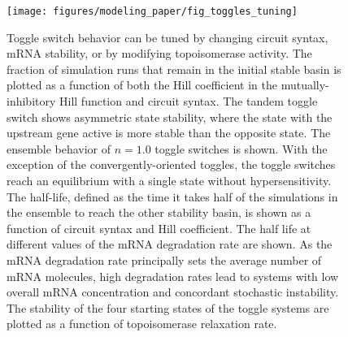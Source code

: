 \documentclass[11pt]{article}
\begin{document}
\begin{figure}[htbp]
    \centering
    {\texttt{[image: figures/modeling\_paper/fig\_toggles\_tuning]}
    \label{fig:toggle_tunability_cartoon}
    \label{fig:toggle_basin_stability}
    \label{fig:toggle_n1_basins}
    \label{fig:toggle_half_life_vs_hill}
    \label{fig:toggle_half_life_vs_mRNA_deg}
    \label{fig:toggle_vs_topo_rate}
    }
    \caption{
         Toggle switch behavior can be tuned by changing circuit syntax, mRNA stability, or by modifying topoisomerase activity.
         The fraction of simulation runs that remain in the initial stable basin is plotted as a function of both the Hill coefficient in the mutually-inhibitory Hill function and circuit syntax. The tandem toggle switch shows asymmetric state stability, where the state with the upstream gene active is more stable than the opposite state.
         The ensemble behavior of \(n = 1.0\) toggle switches is shown. With the exception of the convergently-oriented toggles, the toggle switches reach an equilibrium with a single state without hypersensitivity.
         The half-life, defined as the time it takes half of the simulations in the ensemble to reach the other stability basin, is shown as a function of circuit syntax and Hill coefficient.
         The half life at different values of the mRNA degradation rate are shown. As the mRNA degradation rate principally sets the average number of mRNA molecules, high degradation rates lead to systems with low overall mRNA concentration and concordant stochastic instability.
         The stability of the four starting states of the toggle systems are plotted as a function of topoisomerase relaxation rate.
    } \label{fig:top:toggle_switch_tuning}
\end{figure}

\FloatBarrier
\end{document}
